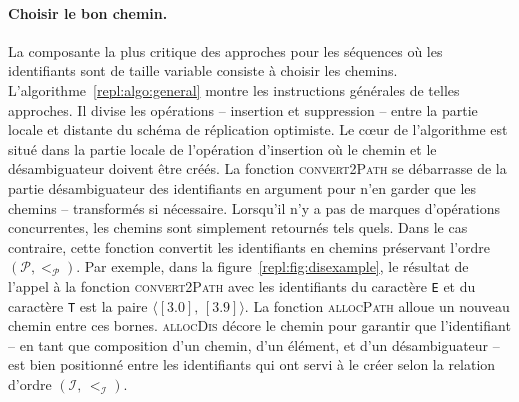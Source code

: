 

\paragraph{Choisir le bon chemin.} La composante la plus critique des approches
pour les séquences où les identifiants sont de taille variable consiste à
choisir les chemins. L'algorithme~\ref{repl:algo:general} montre les
instructions générales de telles approches. Il divise les opérations --
insertion et suppression -- entre la partie locale et distante du schéma de
réplication optimiste. Le cœur de l'algorithme est situé dans la partie locale
de l'opération d'insertion où le chemin et le désambiguateur doivent être
créés. La fonction \textsc{convert2Path} se débarrasse de la partie
désambiguateur des identifiants en argument pour n'en garder que les chemins --
transformés si nécessaire. Lorsqu'il n'y a pas de marques d'opérations
concurrentes, les chemins sont simplement retournés tels quels. Dans le cas
contraire, cette fonction convertit les identifiants en chemins préservant
l'ordre $(\mathcal{P}, <_\mathcal{P})$. Par exemple, dans la
figure~\ref{repl:fig:disexample}, le résultat de l'appel à la fonction
\textsc{convert2Path} avec les identifiants du caractère \texttt{E} et du
caractère \texttt{T} est la paire $\langle [3.0],\, [3.9] \rangle$. La fonction
\textsc{allocPath} alloue un nouveau chemin entre ces bornes. \textsc{allocDis}
décore le chemin pour garantir que l'identifiant -- en tant que composition d'un
chemin, d'un élément, et d'un désambiguateur -- est bien positionné entre les
identifiants qui ont servi à le créer selon la relation d'ordre
$(\mathcal{I},\, <_\mathcal{I})$.

